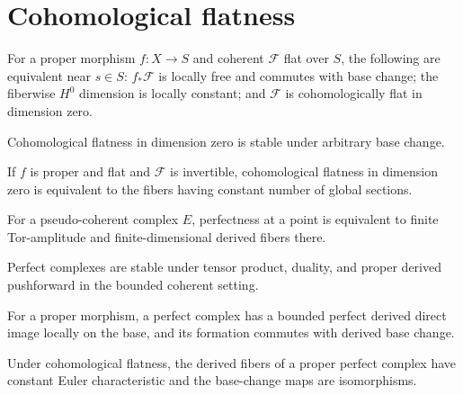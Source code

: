 \section{Cohomological flatness}
\begin{theorem}\label{fga-thm-8-3-2}
For a proper morphism $f:X\to S$ and coherent $\mathcal F$ flat over $S$, the
following are equivalent near $s\in S$: $f_*\mathcal F$ is locally free and
commutes with base change; the fiberwise $H^0$ dimension is locally constant;
and $\mathcal F$ is cohomologically flat in dimension zero.
\end{theorem}
\begin{corollary}\label{fga-cor-8-3-3}
Cohomological flatness in dimension zero is stable under arbitrary base change.
\end{corollary}
\begin{corollary}\label{fga-cor-8-3-4}
If $f$ is proper and flat and $\mathcal F$ is invertible, cohomological
flatness in dimension zero is equivalent to the fibers having constant number
of global sections.
\end{corollary}
\begin{proposition}\label{fga-prop-8-3-6-4}
For a pseudo-coherent complex $E$, perfectness at a point is equivalent to
finite Tor-amplitude and finite-dimensional derived fibers there.
\end{proposition}
\begin{corollary}\label{fga-cor-8-3-6-5}
Perfect complexes are stable under tensor product, duality, and proper derived
pushforward in the bounded coherent setting.
\end{corollary}
\begin{theorem}\label{fga-thm-8-3-8}
For a proper morphism, a perfect complex has a bounded perfect derived direct
image locally on the base, and its formation commutes with derived base change.
\end{theorem}
\begin{corollary}\label{fga-cor-8-3-11}
Under cohomological flatness, the derived fibers of a proper perfect complex
have constant Euler characteristic and the base-change maps are isomorphisms.
\end{corollary}

